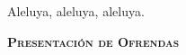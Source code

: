 \documentclass[12pt, letterpaper]{report}
\begin{document}
    \noindent
    Aleluya, aleluya, aleluya.
    \clearpage




    \begin{center}
        {\scshape \Huge {\bfseries Presentaci\'on de Ofrendas}}
    \end{center}
\end{document}
